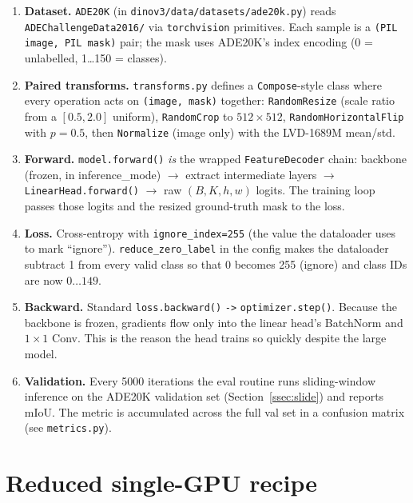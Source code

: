 \documentclass[11pt,a4paper]{article}
\begin{document}
\begin{enumerate}[leftmargin=1.6em,itemsep=0pt]
  \item \textbf{Dataset.} \texttt{ADE20K} (in
        \texttt{dinov3/data/datasets/ade20k.py}) reads
        \texttt{ADEChallengeData2016/} via \texttt{torchvision} primitives.
        Each sample is a \texttt{(PIL image, PIL mask)} pair; the mask uses
        ADE20K's index encoding (0 = unlabelled, 1\ldots150 = classes).
  \item \textbf{Paired transforms.} \texttt{transforms.py} defines a
        \texttt{Compose}-style class where every operation acts on
        \texttt{(image, mask)} together: \texttt{RandomResize} (scale ratio
        from a $[0.5, 2.0]$ uniform), \texttt{RandomCrop} to
        $512{\times}512$, \texttt{RandomHorizontalFlip} with $p{=}0.5$, then
        \texttt{Normalize} (image only) with the LVD-1689M mean/std.
  \item \textbf{Forward.}
        \texttt{model.forward()} \emph{is} the wrapped
        \texttt{FeatureDecoder} chain: backbone (frozen, in inference\_mode)
        $\to$ extract intermediate layers $\to$ \texttt{LinearHead.forward()}
        $\to$ raw $(B, K, h, w)$ logits. The training loop passes those
        logits and the resized ground-truth mask to the loss.
  \item \textbf{Loss.} Cross-entropy with \texttt{ignore\_index=255} (the
        value the dataloader uses to mark ``ignore'').
        \texttt{reduce\_zero\_label} in the config makes the dataloader
        subtract 1 from every valid class so that 0 becomes 255 (ignore)
        and class IDs are now $0\ldots149$.
  \item \textbf{Backward.} Standard \texttt{loss.backward()} \texttt{->}
        \texttt{optimizer.step()}. Because the backbone is frozen,
        gradients flow only into the linear head's BatchNorm and
        $1{\times}1$ Conv. This is the reason the head trains so quickly
        despite the large model.
  \item \textbf{Validation.} Every 5000 iterations the eval routine runs
        sliding-window inference on the ADE20K validation set
        (Section~\ref{ssec:slide}) and reports mIoU. The metric is
        accumulated across the full val set in a confusion matrix
        (see \texttt{metrics.py}).
\end{enumerate}

\section{Reduced single-GPU recipe}
\end{document}
